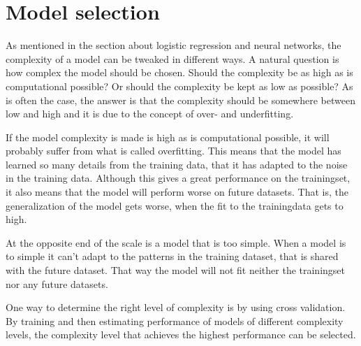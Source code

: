 \section{Model selection}
As mentioned in the section about logistic regression and neural networks, the complexity of a model can be tweaked in different ways. A natural question is how complex the model should be chosen. Should the complexity be as high as is computational possible? Or should the complexity be kept as low as possible? As is often the case, the answer is that the complexity should be somewhere between low and high and it is due to the concept of over- and underfitting. \par
If the model complexity is made is high as is computational possible, it will probably suffer from what is called overfitting. This means that the model has learned so many details from the training data, that it has adapted to the noise in the training data. Although this gives a great performance on the trainingset, it also means that the model will perform worse on future datasets. That is, the generalization of the model gets worse, when the fit to the trainingdata gets to high. \par
At the opposite end of the scale is a model that is too simple. When a model is to simple it can't adapt to the patterns in the training dataset, that is shared with the future dataset. That way the model will not fit neither the trainingset nor any future datasets. \par
One way to determine the right level of complexity is by using cross validation. By training and then estimating performance of models of different complexity levels, the complexity level that achieves the highest performance can be selected.

